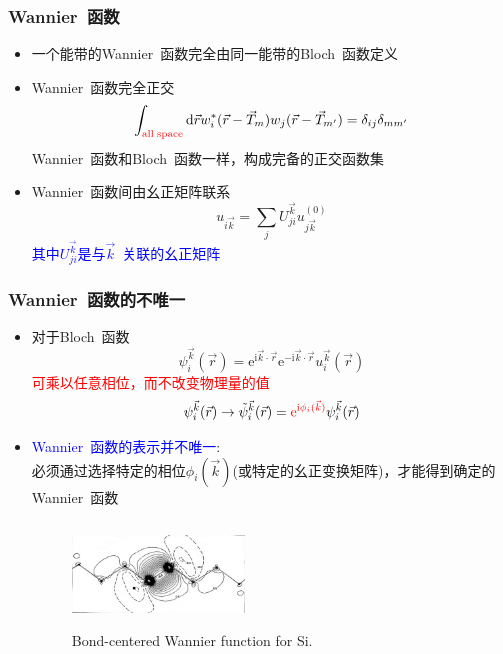 \documentclass[cjk,slidestop,compress,mathserif,blue]{beamer}
\begin{document}
\frame
{
	\frametitle{\textrm{Wannier~}函数}
	\begin{itemize}
		\item 一个能带的\textrm{Wannier~}函数完全由同一能带的\textrm{Bloch~}函数定义
		\item \textrm{Wannier~}函数完全正交
			\begin{displaymath}
				\int_{\textcolor{red}{\mathrm{all\; space}}}\mathrm{d}\vec rw_i^{\ast}(\vec r-\vec T_m)w_j(\vec r-\vec T_{m^{\prime}})=\delta_{ij}\delta_{mm^{\prime}}
			\end{displaymath}
			\textrm{Wannier~}函数和\textrm{Bloch~}函数一样，构成完备的正交函数集
		\item \textrm{Wannier~}函数间由幺正矩阵联系
			\begin{displaymath}
				u_{i\vec k}=\sum_jU_{ji}^{\vec k}u_{j\vec k}^{(0)}
			\end{displaymath}
			\textcolor{blue}{其中$U_{ji}^{\vec k}$是与$\vec k$~关联的幺正矩阵}
	\end{itemize}
}

\frame
{
	\frametitle{\textrm{Wannier~}函数的不唯一}
	\begin{itemize}
		\item 对于\textrm{Bloch~}函数
			\begin{displaymath}
				\psi_i^{\vec k}(\vec r)=\mathrm{e}^{\mathrm{i}\vec k\cdot\vec r}\mathrm{e}^{-\mathrm{i}\vec k\cdot\vec r}u_i^{\vec k}(\vec r)
			\end{displaymath}
			\textcolor{red}{可乘以任意相位，而不改变物理量的值}
			\begin{displaymath}
				\psi_i^{\vec k}(\vec r)\rightarrow\tilde\psi_i^{\vec k}(\vec r)=\textcolor{red}{\mathrm{e}^{\mathrm{i}\phi_i(\vec k)}}\psi_i^{\vec k}(\vec r)
			\end{displaymath}
		\item \textcolor{blue}{\textrm{Wannier~}函数的表示并不唯一}:\\
必须通过选择特定的相位$\phi_i(\vec k)$(或特定的幺正变换矩阵)，才能得到确定的\textrm{Wannier~}函数 
\begin{figure}[h!]
\centering
\vspace*{-0.3in}
\includegraphics[height=1.1in,width=1.8in,viewport=0 0 1100 600,clip]{Figures/Wannier_function-Bondcenter_Si.png}
\caption{\tiny \textrm{Bond-centered Wannier function for Si.}}%
\label{Bond-Centered Wannier function}
\end{figure} 
	\end{itemize}
}
\end{document}
